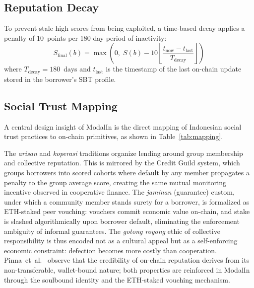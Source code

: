 \documentclass[conference]{IEEEtran}
\begin{document}
\subsection{Reputation Decay}

To prevent stale high scores from being exploited, a time-based decay applies
a penalty of 10~points per 180-day period of inactivity:
%
\begin{equation}
S_\text{final}(b) = \max\!\left(0,\; S(b) - 10
  \left\lfloor \frac{t_\text{now} - t_\text{last}}{T_\text{decay}}
  \right\rfloor \right)
\label{eq:decay}
\end{equation}
%
where $T_\text{decay} = 180$~days and $t_\text{last}$ is the timestamp of the
last on-chain update stored in the borrower's SBT profile.

\subsection{Social Trust Mapping}

A central design insight of ModalIn is the direct mapping of Indonesian social
trust practices to on-chain primitives, as shown in Table~\ref{tab:mapping}.

The \textit{arisan} and \textit{koperasi} traditions organize lending around
group membership and collective reputation. This is mirrored by the Credit
Guild system, which groups borrowers into scored cohorts where default by
any member propagates a penalty to the group average score, creating the same
mutual monitoring incentive observed in cooperative finance. The
\textit{jaminan} (guarantee) custom, under which a community member stands
surety for a borrower, is formalized as ETH-staked peer vouching: vouchers
commit economic value on-chain, and stake is slashed algorithmically upon
borrower default, eliminating the enforcement ambiguity of informal
guarantees. The \textit{gotong royong} ethic of collective responsibility is
thus encoded not as a cultural appeal but as a self-enforcing economic
constraint: defection becomes more costly than cooperation.
Pinna~et~al.~\cite{b22} observe that the credibility of on-chain reputation
derives from its non-transferable, wallet-bound nature; both properties
are reinforced in ModalIn through the soulbound identity and the
ETH-staked vouching mechanism.
\end{document}
